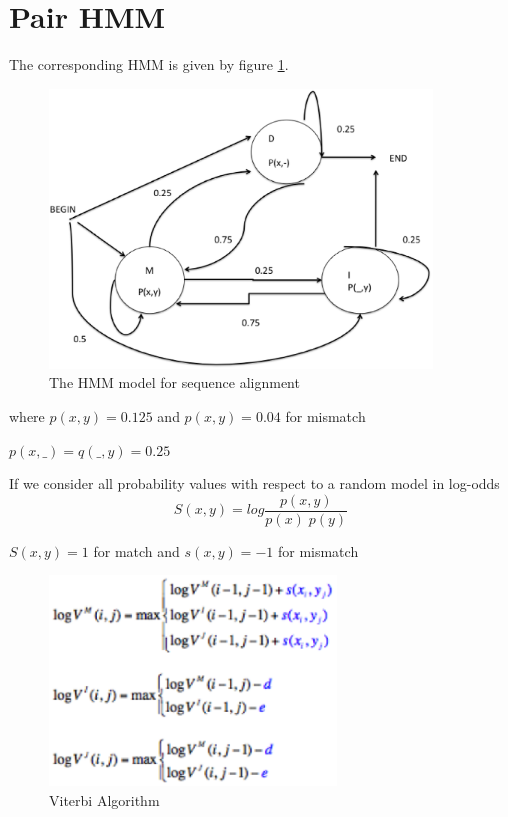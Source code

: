 \documentclass[english, a4paper,11pt]{article}
\begin{document}
\section{Pair HMM}

The corresponding HMM is given by figure \ref{fig:hmmmodel}.

\begin{figure}
\begin{centering}
\includegraphics[width=4in]{Slide5}
\par\end{centering}
\caption{The HMM model for sequence alignment}
\label{fig:hmmmodel}
\end{figure}

where $p(x,y)=0.125$ and $p(x,y)=0.04$ for mismatch

$p(x,\_)=q(\_,y)=0.25$

If we consider all probability values with respect to a random model
in log-odds
$$S(x,y)=log\frac{p(x,y)}{p(x)\; p(y)}$$

$S(x,y)=1$ for match and $s(x,y)=-1$ for mismatch

\begin{figure}
\begin{centering}
\includegraphics[width=3in]{Viterbi}
\par\end{centering}
\caption{Viterbi Algorithm}
\end{figure}
\end{document}
